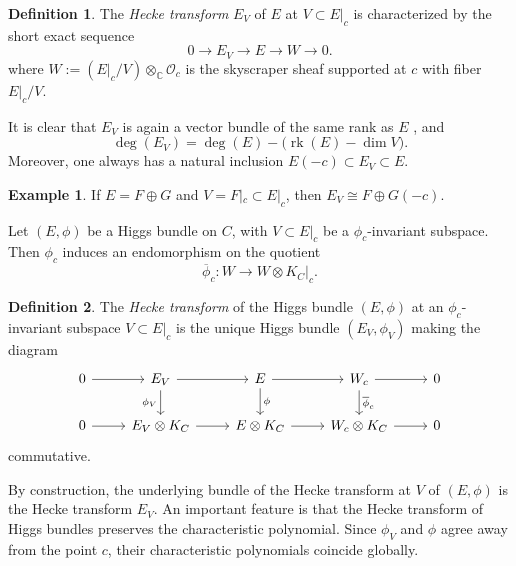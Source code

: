 \documentclass[twoside, 11pt]{article}
\numberwithin{equation}{section}
\theoremstyle{theorem}
\numberwithin{theorem}{section}
\theoremstyle{definition}
\newtheorem{definition}[definition]{Definition}
\newtheorem{example}[example]{Example}
\begin{document}
\begin{definition}
The \emph{Hecke transform} $E_V$ of \(E\) at \(V\subset E|_c\) is characterized by the short exact sequence
\[
0 \longrightarrow E_V \longrightarrow E \longrightarrow W \longrightarrow 0.
\]
where \(W:=(E|_c/V)\otimes_{\mathbb C}\mathcal O_c\) is the skyscraper sheaf supported at \(c\) with fiber \(E|_c/V\). 
\end{definition}
It is clear that \(E_V\) is again a vector bundle of the same rank as $E$ , and
\[
\deg(E_V)=\deg(E)-\bigl(\operatorname{rk}(E)-\dim V\bigr).
\]
Moreover, one always has a natural inclusion
\(
E(-c)\subset E_V\subset E.
\)

\begin{example}
If \(E=F\oplus G\) and \(V=F|_c\subset E|_c\), then
\(
E_V \cong F\oplus G(-c).
\)
\end{example}

Let \((E,\phi)\) be a Higgs bundle on \(C\), with \(V\subset E|_c\)
be a \(\phi_c\)-invariant subspace. Then \(\phi_c\) induces an endomorphism on the quotient
\[
\overline{\phi}_c:W\longrightarrow W\otimes K_C|_c.
\]

\begin{definition}
The \emph{Hecke transform} of the Higgs bundle \((E,\phi)\) at an \(\phi_c\)-invariant subspace
\(V\subset E|_c\) is the unique Higgs bundle \((E_V,\phi_V)\) making the diagram
\[
\begin{tikzcd}
0 \arrow[r] & E_V \arrow[r] \arrow[d,"\phi_V"'] & E \arrow[r,] \arrow[d,"\phi"] & W_c \arrow[r] \arrow[d,"\overline{\phi}_c"] & 0 \\
0 \arrow[r] & E_V\otimes K_C \arrow[r] & E\otimes K_C \arrow[r] & W_c\otimes K_C \arrow[r] & 0
\end{tikzcd}
\]
commutative. 
\end{definition}

By construction, the underlying bundle of the Hecke transform at $V$ of $(E, \phi)$ is the Hecke transform \(E_V\). An important feature is that the Hecke transform of Higgs bundles preserves the characteristic polynomial. Since \(\phi_V\) and \(\phi\) agree away from the point \(c\), their characteristic polynomials coincide globally.
\end{document}
